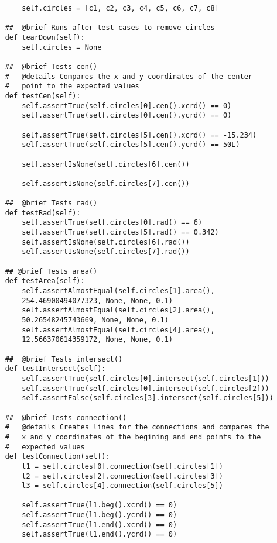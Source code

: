 \documentclass{article}
\begin{document}
\begin{lstlisting}
        self.circles = [c1, c2, c3, c4, c5, c6, c7, c8]
    
    ##  @brief Runs after test cases to remove circles
    def tearDown(self):
        self.circles = None
        
    ##  @brief Tests cen()
    #   @details Compares the x and y coordinates of the center 
    #   point to the expected values
    def testCen(self):
        self.assertTrue(self.circles[0].cen().xcrd() == 0)
        self.assertTrue(self.circles[0].cen().ycrd() == 0)

        self.assertTrue(self.circles[5].cen().xcrd() == -15.234)
        self.assertTrue(self.circles[5].cen().ycrd() == 50L)

        self.assertIsNone(self.circles[6].cen())

        self.assertIsNone(self.circles[7].cen())
        
    ##  @brief Tests rad()
    def testRad(self):
        self.assertTrue(self.circles[0].rad() == 6)
        self.assertTrue(self.circles[5].rad() == 0.342)
        self.assertIsNone(self.circles[6].rad())
        self.assertIsNone(self.circles[7].rad())
           
    ## @brief Tests area()
    def testArea(self):
        self.assertAlmostEqual(self.circles[1].area(), 
        254.46900494077323, None, None, 0.1)
        self.assertAlmostEqual(self.circles[2].area(), 
        50.26548245743669, None, None, 0.1)
        self.assertAlmostEqual(self.circles[4].area(), 
        12.566370614359172, None, None, 0.1)
        
    ##  @brief Tests intersect()
    def testIntersect(self):
        self.assertTrue(self.circles[0].intersect(self.circles[1]))
        self.assertTrue(self.circles[0].intersect(self.circles[2]))
        self.assertFalse(self.circles[3].intersect(self.circles[5]))
        
    ##  @brief Tests connection()
    #   @details Creates lines for the connections and compares the 
    #   x and y coordinates of the begining and end points to the 
    #   expected values
    def testConnection(self):
        l1 = self.circles[0].connection(self.circles[1])
        l2 = self.circles[2].connection(self.circles[3])
        l3 = self.circles[4].connection(self.circles[5])

        self.assertTrue(l1.beg().xcrd() == 0)
        self.assertTrue(l1.beg().ycrd() == 0)
        self.assertTrue(l1.end().xcrd() == 0)
        self.assertTrue(l1.end().ycrd() == 0)


\end{lstlisting}
\end{document}
